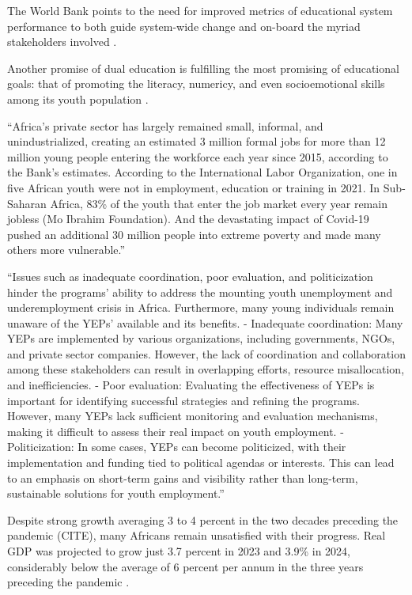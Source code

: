 \documentclass[
  a4paper, twoside, 12pt]{book}
\begin{document}
The World Bank points to the need for improved metrics of educational system performance to both guide system-wide change and on-board the myriad stakeholders involved \autocite{arias2019}.

Another promise of dual education is fulfilling the most promising of educational goals: that of promoting the literacy, numericy, and even socioemotional skills among its youth population \autocite{arias2019}.

``Africa's private sector has largely remained small, informal, and unindustrialized, creating an estimated 3 million formal jobs for more than 12 million young people entering the workforce each year since 2015, according to the Bank's estimates. According to the International Labor Organization, one in five African youth were not in employment, education or training in 2021. In Sub-Saharan Africa, 83\% of the youth that enter the job market every year remain jobless (Mo Ibrahim Foundation). And the devastating impact of Covid-19 pushed an additional 30 million people into extreme poverty and made many others more vulnerable.''

``Issues such as inadequate coordination, poor evaluation, and politicization hinder the programs' ability to address the mounting youth unemployment and underemployment crisis in Africa. Furthermore, many young individuals remain unaware of the YEPs' available and its benefits.
- Inadequate coordination: Many YEPs are implemented by various organizations, including governments, NGOs, and private sector companies. However, the lack of coordination and collaboration among these stakeholders can result in overlapping efforts, resource misallocation, and inefficiencies.
- Poor evaluation: Evaluating the effectiveness of YEPs is important for identifying successful strategies and refining the programs. However, many YEPs lack sufficient monitoring and evaluation mechanisms, making it difficult to assess their real impact on youth employment.
- Politicization: In some cases, YEPs can become politicized, with their implementation and funding tied to political agendas or interests. This can lead to an emphasis on short-term gains and visibility rather than long-term, sustainable solutions for youth employment.''

Despite strong growth averaging 3 to 4 percent in the two decades preceding the pandemic (CITE), many Africans remain unsatisfied with their progress. Real GDP was projected to grow just 3.7 percent in 2023 and 3.9\% in 2024, considerably below the average of 6 percent per annum in the three years preceding the pandemic \autocite{africandevelopmentbank2023}.
\end{document}
